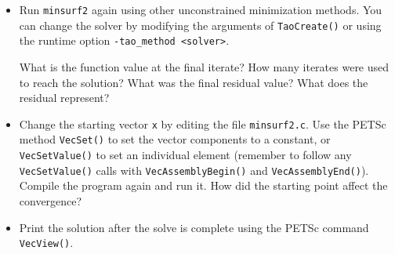 \documentclass[11pt]{article}
\begin{document}
\begin{enumerate}
\begin{itemize}
  \item
  Run \texttt{minsurf2} again using other unconstrained minimization
  methods.    You can change the solver by modifying the arguments of
  \texttt{TaoCreate()} or using the runtime option \texttt{-tao\_method <solver>}.

  What is the function value at the final iterate?
  How many iterates were used to reach
  the solution?  What was the final residual value? What does the residual represent?

 \item
  Change the starting vector \texttt{x} by editing the file \texttt{minsurf2.c}.
  Use the PETSc method {\tt VecSet()}
  to set the vector components to a constant, or {\tt VecSetValue()} to set
  an individual element (remember to follow any {\tt VecSetValue()} calls
  with {\tt VecAssemblyBegin()} and {\tt VecAssemblyEnd()}).  Compile the program again and run it.
  How did the starting point affect the convergence?

 \item Print the solution after the solve is complete using the PETSc command {\tt VecView()}.
\end{itemize}

\end{enumerate}
\end{document}
